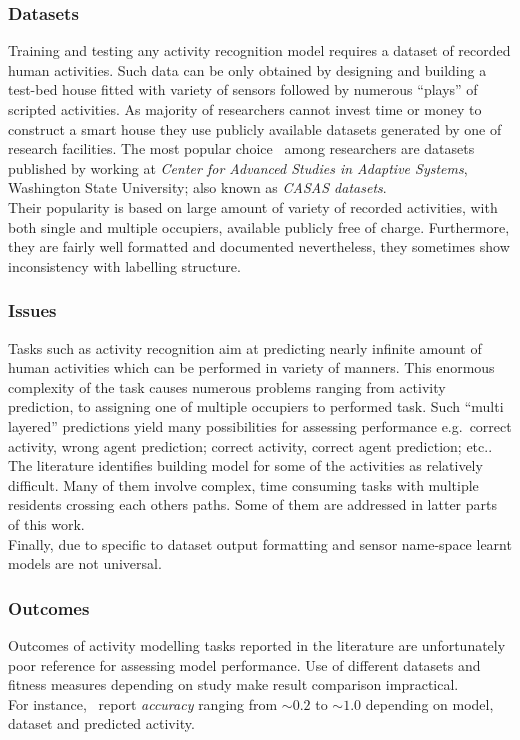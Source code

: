 \documentclass[12pt, a4paper, pdflatex, leqno, twoside, openright]{report}
\begin{document}
      \subsubsection{Datasets}
Training and testing any activity recognition model requires a dataset of recorded human activities. Such data can be only obtained by designing and building a test-bed house fitted with variety of sensors followed by numerous ``plays'' of scripted activities. As majority of researchers cannot invest time or money to construct a smart house they use publicly available datasets generated by one of research facilities. The most popular choice~\citep{fatima2013unified,fatima2013analysis,nazerfard2010conditional,cook2009assessing} among researchers are datasets published by \citet{cook2009assessing} working at \emph{Center for Advanced Studies in Adaptive Systems}, Washington State University; also known as \emph{CASAS datasets}.\\
Their popularity is based on large amount of variety of recorded activities, with both single and multiple occupiers, available publicly free of charge. Furthermore, they are fairly well formatted and documented nevertheless, they sometimes show inconsistency with labelling structure.

      \subsubsection{Issues}
Tasks such as activity recognition aim at predicting nearly infinite amount of human activities which can be performed in variety of manners. This enormous complexity of the task causes numerous problems ranging from activity prediction, to assigning one of multiple occupiers to performed task. Such ``multi layered'' predictions yield many possibilities for assessing performance e.g.\ correct activity, wrong agent prediction; correct activity, correct agent prediction; etc..\\

The literature identifies building model for some of the activities as relatively difficult. Many of them involve complex, time consuming tasks with multiple residents crossing each others paths. Some of them are addressed in latter parts of this work.\\

Finally, due to specific to dataset output formatting and sensor name-space learnt models are not universal.

      \subsubsection{Outcomes}
Outcomes of activity modelling tasks reported in the literature are unfortunately poor reference for assessing model performance. Use of different datasets and fitness measures depending on study make result comparison impractical.\\
For instance,~\citet{fatima2013analysis} report \emph{accuracy} ranging from $\sim0.2$ to $\sim1.0$ depending on model, dataset and predicted activity.
\end{document}
